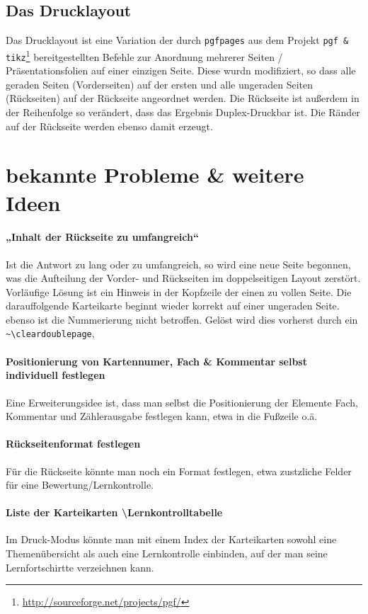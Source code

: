 \documentclass[a4paper]{article}
\begin{document}
\subsection{Das Drucklayout}
Das Drucklayout ist eine Variation der durch \lstinline!pgfpages! aus dem Projekt \lstinline!pgf & tikz!\footnote{\url{http://sourceforge.net/projects/pgf/}} bereitgestellten Befehle zur Anordnung mehrerer Seiten / Präsentationsfolien auf einer einzigen Seite. Diese wurdn modifiziert, so dass alle geraden Seiten (Vorderseiten) auf der ersten und alle ungeraden Seiten (Rückseiten) auf der Rückseite angeordnet werden. Die Rückseite ist außerdem in der Reihenfolge so verändert, dass das Ergebnis Duplex-Druckbar ist. Die Ränder auf der Rückseite werden ebenso damit erzeugt. 
%
%
%
\section{bekannte Probleme \& weitere Ideen}
\paragraph{„Inhalt der Rückseite zu umfangreich“} %
Ist die Antwort zu lang oder zu umfangreich, so wird eine neue Seite begonnen, was die Aufteilung der Vorder- und Rückseiten im doppelseitigen Layout zerstört. Vorläufige Lösung ist ein Hinweis in der Kopfzeile der einen zu vollen Seite. Die darauffolgende Karteikarte beginnt wieder korrekt auf einer ungeraden Seite. ebenso ist die Nummerierung nicht betroffen. Gelöst wird dies vorherst durch ein \lstinline!~\cleardoublepage!, 

\paragraph{Positionierung von Kartennumer, Fach \& Kommentar selbst individuell festlegen}
Eine Erweiterungsidee ist, dass man selbst die Positionierung der Elemente Fach, Kommentar und Zählerausgabe festlegen kann, etwa in die Fußzeile o.ä.

\paragraph{Rückseitenformat festlegen} 
Für die Rückseite könnte man noch ein Format festlegen, etwa zustzliche Felder für eine Bewertung/Lernkontrolle.

\paragraph{Liste der Karteikarten \textbackslash Lernkontrolltabelle} 
Im Druck-Modus könnte man mit einem Index der Karteikarten sowohl eine Themenübersicht als auch eine Lernkontrolle einbinden, auf der man seine Lernfortschirtte verzeichnen kann.
\newpage
\end{document}
